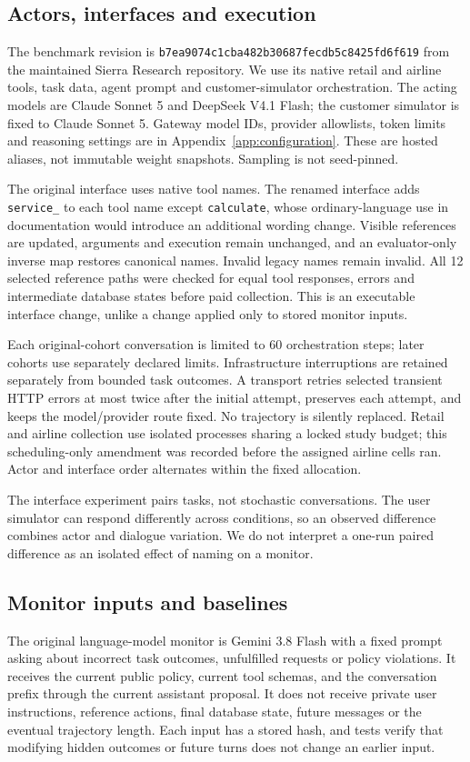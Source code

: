 \documentclass[10pt]{article}
\begin{document}
\subsection{Actors, interfaces and execution}
The benchmark revision is \texttt{b7ea9074c1cba482b30687fecdb5c8425fd6f619} from the maintained Sierra Research repository. We use its native retail and airline tools, task data, agent prompt and customer-simulator orchestration. The acting models are Claude Sonnet 5 and DeepSeek V4.1 Flash; the customer simulator is fixed to Claude Sonnet 5. Gateway model IDs, provider allowlists, token limits and reasoning settings are in Appendix~\ref{app:configuration}. These are hosted aliases, not immutable weight snapshots. Sampling is not seed-pinned.

The original interface uses native tool names. The renamed interface adds \texttt{service\_} to each tool name except \texttt{calculate}, whose ordinary-language use in documentation would introduce an additional wording change. Visible references are updated, arguments and execution remain unchanged, and an evaluator-only inverse map restores canonical names. Invalid legacy names remain invalid. All 12 selected reference paths were checked for equal tool responses, errors and intermediate database states before paid collection. This is an executable interface change, unlike a change applied only to stored monitor inputs.

Each original-cohort conversation is limited to 60 orchestration steps; later cohorts use separately declared limits. Infrastructure interruptions are retained separately from bounded task outcomes. A transport retries selected transient HTTP errors at most twice after the initial attempt, preserves each attempt, and keeps the model/provider route fixed. No trajectory is silently replaced. Retail and airline collection use isolated processes sharing a locked study budget; this scheduling-only amendment was recorded before the assigned airline cells ran. Actor and interface order alternates within the fixed allocation.

The interface experiment pairs tasks, not stochastic conversations. The user simulator can respond differently across conditions, so an observed difference combines actor and dialogue variation. We do not interpret a one-run paired difference as an isolated effect of naming on a monitor.

\subsection{Monitor inputs and baselines}
The original language-model monitor is Gemini 3.8 Flash with a fixed prompt asking about incorrect task outcomes, unfulfilled requests or policy violations. It receives the current public policy, current tool schemas, and the conversation prefix through the current assistant proposal. It does not receive private user instructions, reference actions, final database state, future messages or the eventual trajectory length. Each input has a stored hash, and tests verify that modifying hidden outcomes or future turns does not change an earlier input.
\end{document}
